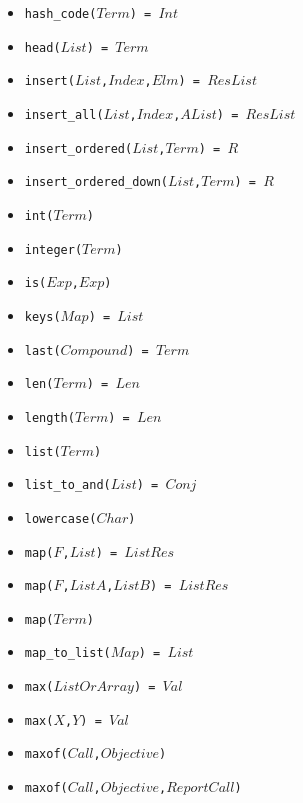 \documentclass[10pt]{article}
\begin{document}
\begin{multicols}{2}
\begin{scriptsize}
\begin{itemize}
    \item \texttt{hash\_code($Term$) = $Int$} 
    \item \texttt{head($List$) = $Term$} 
    \item \texttt{insert($List$,$Index$,$Elm$) = $ResList$} 
    \item \texttt{insert\_all($List$,$Index$,$AList$) = $ResList$} 
    \item \texttt{insert\_ordered($List$,$Term$) = $R$} 
    \item \texttt{insert\_ordered\_down($List$,$Term$) = $R$} 
    \item \texttt{int($Term$)} 
    \item \texttt{integer($Term$)} 
    \item \texttt{is($Exp$,$Exp$)} 
    \item \texttt{keys($Map$) = $List$} 
    \item \texttt{last($Compound$) = $Term$} 
    \item \texttt{len($Term$) = $Len$} 
    \item \texttt{length($Term$) = $Len$} 
    \item \texttt{list($Term$)} 
    \item \texttt{list\_to\_and($List$) = $Conj$}
    \item \texttt{lowercase($Char$)} 
    \item \texttt{map($F$,$List$) = $ListRes$} 
    \item \texttt{map($F$,$ListA$,$ListB$) = $ListRes$} 
    \item \texttt{map($Term$)} 
    \item \texttt{map\_to\_list($Map$) = $List$} 
    \item \texttt{max($ListOrArray$) = $Val$} 
    \item \texttt{max($X$,$Y$) = $Val$} 
    \item \texttt{maxof($Call$,$Objective$)} 
    \item \texttt{maxof($Call$,$Objective$,$ReportCall$)} 

\end{itemize}
\end{scriptsize}
\end{multicols}
\end{document}
